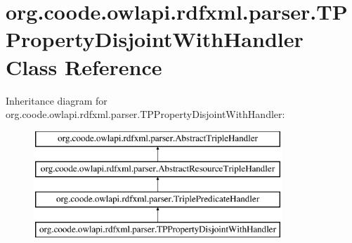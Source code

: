 \hypertarget{classorg_1_1coode_1_1owlapi_1_1rdfxml_1_1parser_1_1_t_p_property_disjoint_with_handler}{\section{org.\-coode.\-owlapi.\-rdfxml.\-parser.\-T\-P\-Property\-Disjoint\-With\-Handler Class Reference}
\label{classorg_1_1coode_1_1owlapi_1_1rdfxml_1_1parser_1_1_t_p_property_disjoint_with_handler}
}
Inheritance diagram for org.\-coode.\-owlapi.\-rdfxml.\-parser.\-T\-P\-Property\-Disjoint\-With\-Handler\-:\begin{figure}[H]
\begin{center}
\leavevmode
\includegraphics[height=4.000000cm]{classorg_1_1coode_1_1owlapi_1_1rdfxml_1_1parser_1_1_t_p_property_disjoint_with_handler}
\end{center}
\end{figure}
